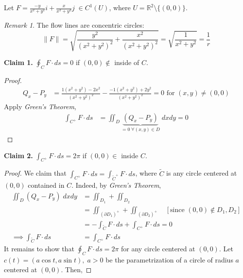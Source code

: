 \documentclass[12pt]{book}
\theoremstyle{definition}
\theoremstyle{remark}
\newtheorem*{remark}{Remark}
\begin{document}
  \begin{example}
    Let $F = \frac{-y}{x^2 + y^2}i + \frac{x}{x^2 + y^2} j \; \in C^1 (U)$, where $U =\mathbb{R}^2  \setminus \{(0,0)\}$. 
    \begin{remark} 
      The flow lines are concentric circles:
    $$\| F \| = \sqrt{\frac{y^2}{(x^2+ y^2)^2} + \frac{x^2}{(x^2 + y^2 )^2} } = \sqrt{\frac{1}{x^2+ y^2} } = \frac{1}{r}  $$
    \end{remark}
    \noindent \textbf{Claim 1.} $\oint_C F \cdot ds = 0$ if $(0,0)\notin$ inside of $C$. 
    \begin{proof} 
      \begin{equation*}
        \begin{split}
          Q_x - P_y &= \frac{1(x^2 + y^2) -2x^2}{(x^2 + y^2 )^2} - \frac{-1(x^2 + y^2)+ 2y^2}{(x^2 + y^2 )^2} = 0 \text{ for } (x,y)\neq (0,0)  
        \end{split}
      \end{equation*}
    Apply \textit{Green's Theorem}, 
      \begin{equation*}
        \begin{split}
          \int_{C^+} F \cdot ds &= \iint_D \underbrace{(Q_x - P_y)}_{=0 \; \forall (x,y)\in D} \; dxdy = 0  
        \end{split}
      \end{equation*}
    \end{proof}
    \noindent \textbf{Claim 2.} $\int_{C^+} F \cdot {ds} = 2\pi $ if $(0,0) \in$ inside $C$. 
    \begin{proof} 
      We claim that $\int_{C^+} F \cdot {ds} = \int_{\tilde C^+} F \cdot ds$, where $\tilde C$ is any circle centered at $(0,0)$ contained in $C.$ Indeed, by \textit{Green's Theorem},
      \begin{equation*}
        \begin{split}
          \iint_D (Q_x - P_y) \; dx dy  &= \iint_{D_1} + \iint_{D_2} \\ 
          &= \iint_{(\partial D_1)^+} + \iint_{(\partial D_2)^+} \quad [\text{since }(0,0) \notin D_1, D_2] \\ 
          &=  - \int_{\tilde C} F \cdot {ds}+\int_{C^+} F \cdot ds = 0\\ 
          \implies \int_{\tilde C} F \cdot {ds}&=\int_{C^+} F \cdot ds
        \end{split}
      \end{equation*}
      It remains to show that $\oint_C F \cdot ds = 2 \pi$ for any circle centered at $(0,0)$. Let $c(t) = (a \cos t , a \sin t), \; a > 0$ be the parametrization of a circle of radius $a$ centered at $(0,0).$ Then, 

\end{proof}
\end{example}
\end{document}
